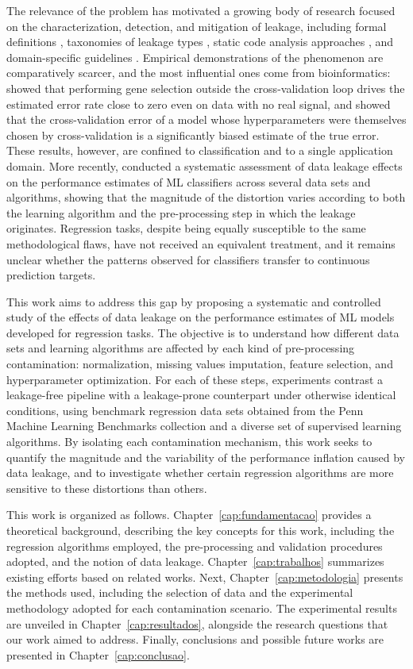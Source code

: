 The relevance of the problem has motivated a growing body of research focused on
the characterization, detection, and mitigation of leakage, including formal
definitions \cite{kaufman2012}, taxonomies of leakage types \cite{kapoor2023},
static code analysis approaches \cite{drobnjakovic2022,yang2022}, and
domain-specific guidelines \cite{bernett2024,apicella2024}. Empirical
demonstrations of the phenomenon are comparatively scarcer, and the most
influential ones come from bioinformatics:  showed that
performing gene selection outside the cross-validation loop drives the estimated
error rate close to zero even on data with no real signal, and
 showed that the cross-validation error of a model whose
hyperparameters were themselves chosen by cross-validation is a significantly
biased estimate of the true error. These results, however, are confined to
classification and to a single application domain. More recently,
 conducted a systematic assessment of data leakage effects
on the performance estimates of ML classifiers across several data sets and
algorithms, showing that the magnitude of the distortion varies according to both
the learning algorithm and the pre-processing step in which the leakage
originates. Regression tasks, despite being equally susceptible to the same
methodological flaws, have not received an equivalent treatment, and it remains
unclear whether the patterns observed for classifiers transfer to continuous
prediction targets.

This work aims to address this gap by proposing a systematic and controlled study
of the effects of data leakage on the performance estimates of ML models
developed for regression tasks. The objective is to understand how different data
sets and learning algorithms are affected by each kind of pre-processing
contamination: normalization, missing values imputation, feature selection, and
hyperparameter optimization. For each of these steps, experiments contrast a
leakage-free pipeline with a leakage-prone counterpart under otherwise identical
conditions, using benchmark regression data sets obtained from the Penn Machine
Learning Benchmarks collection \cite{romano2022} and a diverse set of supervised
learning algorithms. By isolating each contamination mechanism, this work seeks
to quantify the magnitude and the variability of the performance inflation caused
by data leakage, and to investigate whether certain regression algorithms are
more sensitive to these distortions than others.

This work is organized as follows. Chapter~\ref{cap:fundamentacao} provides a
theoretical background, describing the key concepts for this work, including the
regression algorithms employed, the pre-processing and validation procedures
adopted, and the notion of data leakage. Chapter~\ref{cap:trabalhos} summarizes
existing efforts based on related works. Next, Chapter~\ref{cap:metodologia}
presents the methods used, including the selection of data and the experimental
methodology adopted for each contamination scenario. The experimental results are
unveiled in Chapter~\ref{cap:resultados}, alongside the research questions that
our work aimed to address. Finally, conclusions and possible future works are
presented in Chapter~\ref{cap:conclusao}.
